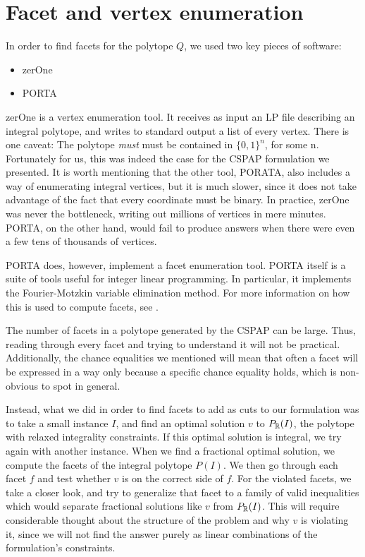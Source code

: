 \section{Facet and vertex enumeration}
\label{app:facets}

In order to find facets for the polytope $Q$, we used two key pieces of software:
\begin{itemize}
\item zerOne\cite{Bussieck:1998:VSS:302316.302321}
\item PORTA\cite{PORTA}
\end{itemize}

zerOne is a vertex enumeration tool. It receives as input an LP file describing an integral polytope, and writes to standard output a list of every vertex. There is one caveat: The polytope \emph{must} must be contained in $\{0, 1\}^n$, for some n. Fortunately for us, this was indeed the case for the CSPAP formulation we presented. It is worth mentioning that the other tool, PORATA, also includes a way of enumerating integral vertices, but it is much slower, since it does not take advantage of the fact that every coordinate must be binary. In practice, zerOne was never the bottleneck, writing out millions of vertices in mere minutes. PORTA, on the other hand, would fail to produce answers when there were even a few tens of thousands of vertices.

PORTA does, however, implement a facet enumeration tool. PORTA itself is a suite of tools useful for integer linear programming. In particular, it implements the Fourier-Motzkin variable elimination method. For more information on how this is used to compute facets, see \cite{z-lop-95}.

The number of facets in a polytope generated by the CSPAP can be large. Thus, reading through every facet and trying to understand it will not be practical. Additionally, the chance equalities we mentioned will mean that often a facet will be expressed in a way only because a specific chance equality holds, which is non-obvious to spot in general.

Instead, what we did in order to find facets to add as cuts to our formulation was to take a small instance $I$, and find an optimal solution $v$ to $P_{\mathbb{R}}(I)$, the polytope with relaxed integrality constraints. If this optimal solution is integral, we try again with another instance. When we find a fractional optimal solution, we compute the facets of the integral polytope $P(I)$. We then go through each facet $f$ and test whether $v$ is on the correct side of $f$. For the violated facets, we take a closer look, and try to generalize that facet to a family of valid inequalities which would separate fractional solutions like $v$ from $P_{\mathbb{R}}(I)$. This will require considerable thought about the structure of the problem and why $v$ is violating it, since we will not find the answer purely as linear combinations of the formulation's constraints.

